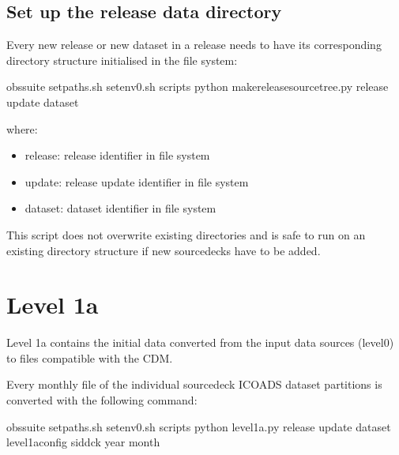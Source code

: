 \documentclass[letterpaper,10pt,english]{sphinxmanual}
\begin{document}
\section{Set up the release data directory}
\label{\detokenize{index:set-up-the-release-data-directory}}
Every new release or new dataset in a release needs to have its corresponding
directory structure initialised in the file system:

\begin{sphinxVerbatim}[commandchars=\\\{\}]
 obs\PYGZhy{}suite
 setpaths.sh
 setenv0.sh
 scripts
python make\PYGZus{}release\PYGZus{}source\PYGZus{}tree.py   release update dataset
\end{sphinxVerbatim}

where:
\begin{itemize}
\item {} 
release: release identifier in file system

\item {} 
update: release update identifier in file system

\item {} 
dataset: dataset identifier in file system

\end{itemize}

This script does not overwrite existing directories and is safe to run on an
existing directory structure if new source\sphinxhyphen{}decks have to be added.


\chapter{Level 1a}
\label{\detokenize{index:level-1a}}
Level 1a contains the initial data converted from the input data sources
(level0) to files compatible with the CDM.

Every monthly file of the individual source\sphinxhyphen{}deck ICOADS dataset partitions is
converted with the following command:

\begin{sphinxVerbatim}[commandchars=\\\{\}]
 obs\PYGZhy{}suite
 setpaths.sh
 setenv0.sh
 scripts
python level1a.py  release update dataset level1a\PYGZus{}config sid\PYGZhy{}dck year month
\end{sphinxVerbatim}
\end{document}

